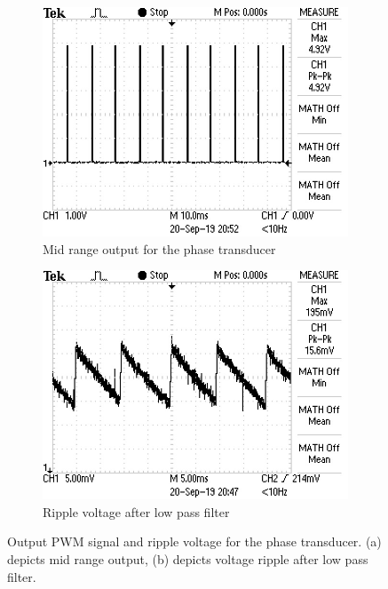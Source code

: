 \begin{figure}[h]
 \centering
    \begin{subfigure}[]{0.45\textwidth}
    \centering
             \includegraphics[width=1\linewidth]{./Figures/phasetransducermidrange.JPG}
    		    \caption{Mid range output for the phase transducer} \label{subfig:phaseshifttransducermidrange}
     \end{subfigure}
      \begin{subfigure}[]{0.45\textwidth}
      \centering
  		\includegraphics[width=1\linewidth]{./Figures/phasetransducernoise.JPG}
		    \caption{Ripple voltage after low pass filter} \label{subfig:phaseshifttransducerripple}
     \end{subfigure}
   \caption[Measured results for the phase transducer]{Output PWM signal and ripple voltage for the phase transducer. (a) depicts mid range output, (b) depicts voltage ripple after low pass filter. }
    \label{fig:simulation_results_box}
 \end{figure}
 




